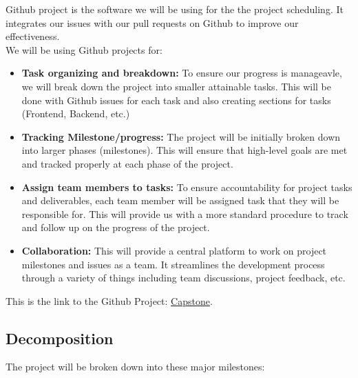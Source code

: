 \documentclass{article}
\begin{document}
Github project is the software we will be using for the the project scheduling.
It integrates our issues with our pull requests on Github to improve our effectiveness.\\
We will be using Github projects for:
\begin{itemize}
	\item \textbf{Task organizing and breakdown: } To ensure our progress is manageavle,
	we will break down the project into smaller attainable tasks. This will be done with
	Github issues for each task and also creating sections for tasks (Frontend, Backend, etc.)
	\item \textbf{Tracking Milestone/progress: } The project will be initially broken down into
	larger phases (milestones). This will ensure that high-level goals are met and tracked
	properly at each phase of the project.
	\item \textbf{Assign team members to tasks: } To ensure accountability for project tasks
	and deliverables, each team member will be assigned task that they will be responsible for.
	This will provide us with a more standard procedure to track and follow up on the
	progress of the project.
	\item \textbf{Collaboration: } This will provide a central platform to work on project
	milestones and issues as a team. It streamlines the development process through a variety
	of things including team discussions, project feedback, etc.
\end{itemize}

This is the link to the Github Project: \href{http://GitHub.com/users/dereklii/projects/2}{Capstone}.

\subsection{Decomposition}


The project will be broken down into these major milestones:
\end{document}
